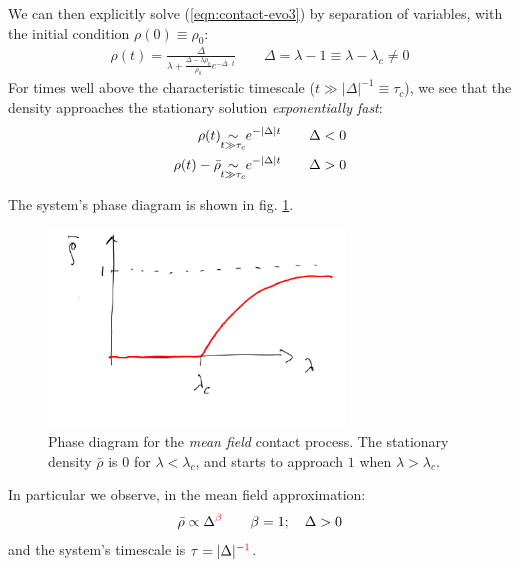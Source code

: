 \documentclass[../../main.tex]{subfiles}
\begin{document}
We can then explicitly solve (\ref{eqn:contact-evo3}) by separation of variables, with the initial condition $\rho(0) \equiv \rho_0$:
\begin{align*}
    \rho(t) = \frac{\Delta}{\lambda + \frac{\Delta - \lambda \rho_0}{\rho_0} e^{- \Delta\cdot  t}} \qquad \Delta = \lambda - 1 \equiv \lambda - \lambda_c \neq 0
\end{align*}
For times well above the characteristic timescale ($t \gg |\Delta|^{-1} \equiv \tau_c$), we see that the density approaches the stationary solution \textit{exponentially fast}:
\begin{align*}
    \rho(t) \> &\underset{\mathclap{t \gg \tau_c}}{\sim}  \> e^{-|\Delta| t} \qquad \Delta < 0\\
    \rho(t) - \bar{\rho} \> &\underset{\mathclap{t \gg \tau_c}}{\sim}  \> e^{-|\Delta| t} \qquad \Delta > 0
\end{align*} 


The system's phase diagram is shown in fig. \ref{fig:diagram-contact}. 

\begin{figure}[H]
    \centering
    \includegraphics[width=0.7\textwidth]{diagram-contact.png}
    \caption{Phase diagram for the \textit{mean field} contact process. The stationary density $\bar{\rho}$ is $0$ for $\lambda < \lambda_c$, and starts to approach $1$ when $\lambda > \lambda_c$.}
    \label{fig:diagram-contact}
\end{figure}

In particular we observe, in the mean field approximation:
\begin{align*}
    \bar{\rho} \propto \Delta^{\textcolor{Red}{\beta}} \qquad \beta = 1; \quad \Delta > 0 
\end{align*}
and the system's timescale is $\tau = |\Delta|^{-\textcolor{Red}{1}}$.
\end{document}
